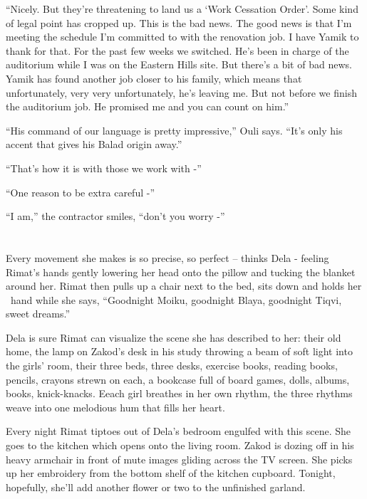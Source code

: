 \documentclass[twoside,11pt]{book}
\begin{document}
``Nicely. But they're threatening to land us a `Work Cessation Order'. Some kind of legal point has cropped
up. This is the bad news. The good news is that I'm meeting the schedule I'm committed to with the renovation job. I
have Yamik to thank for that. For the past few weeks we switched. He's been in charge of the auditorium while I was on
the Eastern Hills site. But there's a bit of bad news. Yamik has found another job closer to his family, which means
that unfortunately, very very unfortunately, he's leaving me. But not before we finish the auditorium job. He promised
me and you can count on him.''

``His command of our language is pretty impressive,'' Ouli says. ``It's only his
accent that gives his Balad origin away.''

``That's how it is with those we work with -''

``One reason to be extra careful -''

``I am,'' the contractor smiles, ``don't you worry -''



\chapter{}

Every movement she makes is so precise, so perfect -- thinks Dela - feeling Rimat's hands gently lowering her head onto
the pillow and tucking the blanket around her. Rimat then pulls up a chair next to the bed, sits down and holds her
\ hand while she says, ``Goodnight Moiku,  goodnight Blaya, goodnight Tiqvi, sweet dreams.''

Dela is sure Rimat can visualize the scene she has described to her: their old home, the lamp on Zakod's desk in his
study throwing a beam of soft light into the girls' room, their three beds, three desks, exercise books, reading
books, pencils, crayons strewn on each, a bookcase full of board games, dolls, albums, books, knick-knacks. Eeach girl
breathes in her own rhythm, the three rhythms weave into one melodious hum that fills her heart.

Every night Rimat tiptoes out of Dela's bedroom engulfed with this scene. She goes to the kitchen which opens onto the
living room. Zakod is dozing off in his heavy armchair in front of mute images gliding across the TV screen. She
picks up her embroidery from the bottom shelf of the kitchen cupboard. Tonight, hopefully, she'll add another flower or
two to the unfinished garland.
\end{document}
